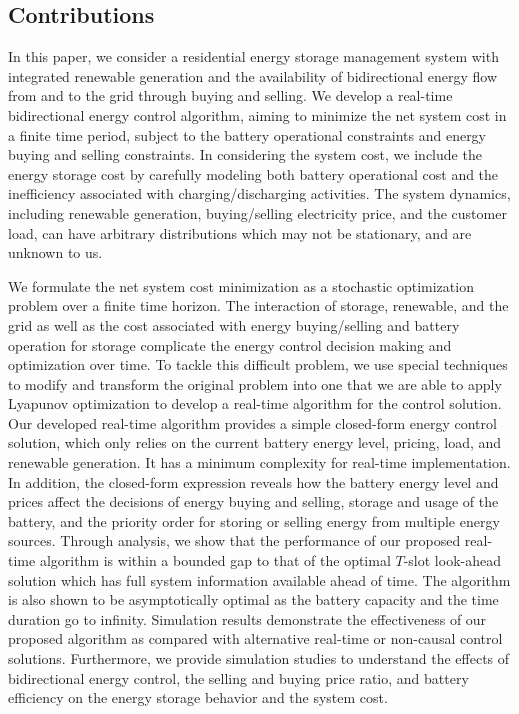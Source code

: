 \documentclass[journal]{IEEEtran}
\begin{document}
\subsection{Contributions}
In this paper, we consider a residential energy storage management system with integrated renewable generation and the availability of bidirectional energy flow from and to the grid through  buying and selling. We develop a real-time bidirectional energy  control algorithm,  aiming to minimize the net system cost in a finite time period, subject to the battery operational constraints and energy buying and selling constraints. In considering the system cost, we include the energy storage cost by carefully modeling both battery  operational cost and the inefficiency associated with charging/discharging activities. The system dynamics, including renewable generation, buying/selling electricity price, and the customer load, can have arbitrary distributions which may not be stationary, and are unknown to us.


We formulate the net system cost minimization as a stochastic optimization problem over a finite time horizon. The interaction of storage, renewable, and the grid as well as the cost associated with energy buying/selling and battery operation for storage complicate the energy control decision making and optimization over time. To tackle this difficult  problem, we use special techniques to modify and transform the original problem into one that we are able to apply Lyapunov optimization to develop a real-time  algorithm for the control solution. Our developed real-time    algorithm provides a simple closed-form energy control solution, which only relies on  the current battery energy level, pricing, load, and renewable generation. It has a minimum complexity for real-time implementation. In addition, the closed-form expression  reveals how the battery energy level and prices  affect the decisions of energy buying and selling, storage and usage of the battery, and the priority order  for storing or selling energy  from multiple energy sources. Through analysis, we show that the performance of our proposed real-time algorithm is within a bounded gap to that of the optimal $T$-slot look-ahead solution which has full  system information available ahead of time. The algorithm is also shown to be asymptotically optimal as the battery capacity and the time duration go to infinity.   Simulation results demonstrate the effectiveness
of our proposed algorithm as compared with alternative real-time or non-causal control solutions. Furthermore, we provide simulation studies  to  understand the effects of bidirectional energy control, the selling and buying price ratio, and battery efficiency on the energy storage behavior and the system cost.
\end{document}
